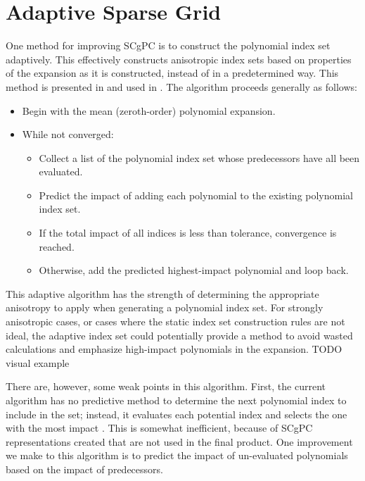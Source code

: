 \section{Adaptive Sparse Grid}
One method for improving SCgPC is to construct the polynomial index set adaptively.  This effectively
constructs anisotropic index sets based on properties of the expansion as it is constructed, instead of in a
predetermined way.  This method is presented in \cite{Gerstner} and used in \cite{Ayres}.  The algorithm
proceeds generally as follows:
\begin{itemize}
  \item Begin with the mean (zeroth-order) polynomial expansion.
  \item While not converged:
    \begin{itemize}
      \item Collect a list of the polynomial index set whose predecessors have all been evaluated.
      \item Predict the impact of adding each polynomial to the existing polynomial index set.
      \item If the total impact of all indices is less than tolerance, convergence is reached.
      \item Otherwise, add the predicted highest-impact polynomial and loop back.
    \end{itemize}
\end{itemize}
This adaptive algorithm has the strength of determining the appropriate anisotropy to apply when generating a
polynomial index set.  For strongly  anisotropic cases, or cases where the static index set construction rules are not
ideal, the adaptive index set could potentially provide a method to avoid wasted calculations and emphasize
high-impact polynomials in the expansion.
TODO visual example

There are, however, some weak points in this algorithm.  First, the current algorithm has no predictive method
to determine the next polynomial index to include in the set; instead, it evaluates each potential index and
selects the one with the most impact \cite{Ayres}.  This is somewhat inefficient, because of SCgPC representations created
that are not used in the final product.  One improvement we make to this algorithm is to predict the impact of
un-evaluated polynomials based on the impact of predecessors.

